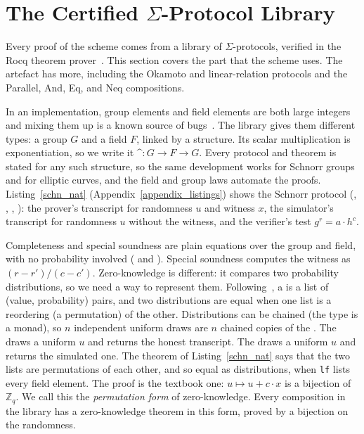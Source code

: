 \section{The Certified $\Sigma$-Protocol Library}\label{schn_proof}
Every proof of the scheme comes from a library of $\Sigma$-protocols, 
verified in the Rocq theorem prover~\cite{the_coq_development_team}.
This section covers the part that the scheme uses. The artefact has
more, including the Okamoto and linear-relation protocols and the
Parallel, And, Eq, and Neq compositions.

In an implementation, group elements and field elements are both large integers and
mixing them up is a known source of bugs~\cite{10.1007/978-3-662-63958-0_24}. 
The library gives them different types: a group $G$ and a field $F$,
linked by a  structure. Its
scalar multiplication is exponentiation, so we write it
$\mbox{\textasciicircum} : G \to F \to G$. Every protocol and
theorem is stated for any such structure, so the same development works
for Schnorr groups and for elliptic curves, and the field and group laws
automate the proofs. Listing~\ref{schn_nat}
(Appendix~\ref{appendix_listings}) shows the Schnorr protocol (, , , ): the prover's transcript for randomness $u$
and witness $x$, the simulator's transcript for randomness $u$ without
the witness, and the verifier's test $g^r = a \cdot h^c$.


Completeness and special soundness are plain equations over the group
and field, with no probability involved (
and ). Special soundness computes
the witness as $(r - r')/(c - c')$. Zero-knowledge is
different: it compares two probability distributions, so we need a way
to represent them. Following~\cite{erwig2006functional}, a  is
a list of (value, probability) pairs, and two distributions are equal
when one list is a reordering (a permutation) of the other. Distributions
can be chained (the type is a monad), so $n$ independent uniform draws
are $n$ chained copies of the . The  draws a
uniform $u$ and returns the honest transcript. The 
draws a uniform $u$ and returns the simulated one. The theorem of
Listing~\ref{schn_nat} says that the two lists are permutations of each
other, and so equal as distributions, when \texttt{lf} lists every field
element. The proof is the textbook one: $u \mapsto u + c\cdot x$ is a
bijection of $\mathbb{Z}_q$. We call this the \emph{permutation form} of
zero-knowledge. Every composition in the library has a zero-knowledge
theorem in this form, proved by a bijection on the randomness.

